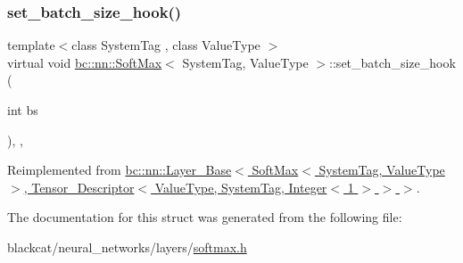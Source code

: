 \mbox{\label{structbc_1_1nn_1_1SoftMax_a0c4652a0da9f1d44e23d8856ca7b8278}} 
\subsubsection{\texorpdfstring{set\+\_\+batch\+\_\+size\+\_\+hook()}{set\_batch\_size\_hook()}}
{\footnotesize\ttfamily template$<$class System\+Tag , class Value\+Type $>$ \\
virtual void \hyperlink{structbc_1_1nn_1_1SoftMax}{bc\+::nn\+::\+Soft\+Max}$<$ System\+Tag, Value\+Type $>$\+::set\+\_\+batch\+\_\+size\+\_\+hook (\begin{DoxyParamCaption}\item[{int}]{bs }\end{DoxyParamCaption})\hspace{0.3cm}{\ttfamily [inline]}, {\ttfamily [override]}, {\ttfamily [virtual]}}



Reimplemented from \hyperlink{structbc_1_1nn_1_1Layer__Base_a8365fc3fc656aadeb0513d8e02b5fba0}{bc\+::nn\+::\+Layer\+\_\+\+Base$<$ Soft\+Max$<$ System\+Tag, Value\+Type $>$, Tensor\+\_\+\+Descriptor$<$ Value\+Type, System\+Tag, Integer$<$ 1 $>$ $>$ $>$}.



The documentation for this struct was generated from the following file\+:\begin{DoxyCompactItemize}
\item 
blackcat/neural\+\_\+networks/layers/\hyperlink{softmax_8h}{softmax.\+h}\end{DoxyCompactItemize}
